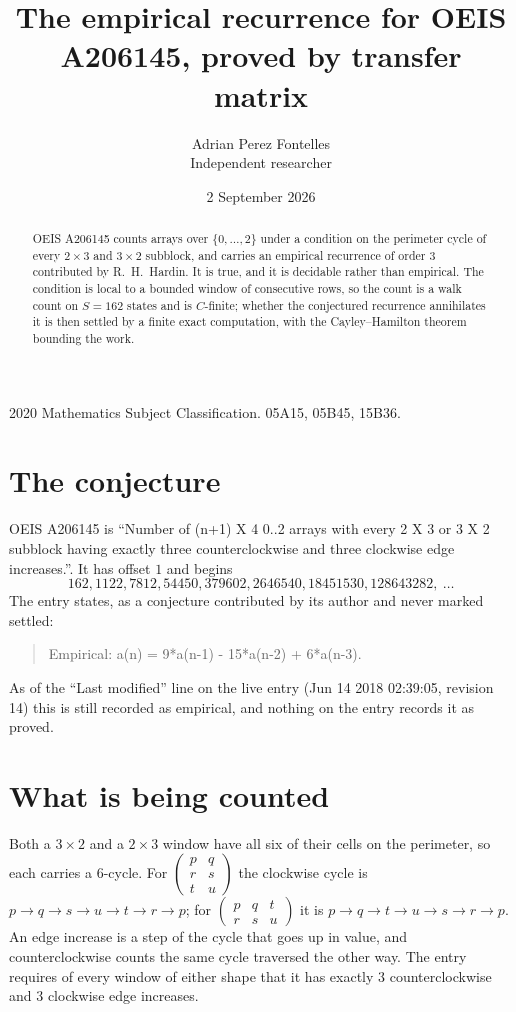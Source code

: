 \documentclass[11pt,a4paper]{article}
\title{The empirical recurrence for OEIS A206145, proved by transfer matrix}
\author{Adrian Perez Fontelles\\ \small Independent researcher}
\date{2 September 2026}
\theoremstyle{plain}
\theoremstyle{definition}
\begin{document}
\maketitle

\begin{abstract}
OEIS A206145 counts arrays over $\{0,\dots,2\}$ under a condition on the perimeter cycle of
every $2\times3$ and $3\times2$ subblock, and carries an empirical recurrence of order $3$ contributed by
R.~H.~Hardin. It is true, and it is decidable rather than empirical. The condition is local to
a bounded window of consecutive rows, so the count is a walk count on $S=162$ states and is
$C$-finite; whether the conjectured recurrence annihilates it is then settled by a finite exact
computation, with the Cayley--Hamilton theorem bounding the work.
\end{abstract}

\noindent\small 2020 Mathematics Subject Classification. 05A15, 05B45, 15B36.\normalsize

\section{The conjecture}

OEIS A206145 is ``Number of (n+1) X 4 0..2 arrays with every 2 X 3 or 3 X 2 subblock having exactly three counterclockwise and three clockwise edge increases.''. It has offset $1$ and begins
\[
162, 1122, 7812, 54450, 379602, 2646540, 18451530, 128643282,\ \dots
\]
The entry states, as a conjecture contributed by its author and never marked settled:
\begin{quote}
Empirical: a(n) = 9*a(n-1) - 15*a(n-2) + 6*a(n-3).
\end{quote}
As of the ``Last modified'' line on the live entry (Jun 14 2018 02:39:05, revision 14) this is still
recorded as empirical, and nothing on the entry records it as proved.

\section{What is being counted}

Both a $3\times2$ and a $2\times3$ window have all six of their cells on the
perimeter, so each carries a $6$-cycle. For
$\begin{pmatrix}p&q\\r&s\\t&u\end{pmatrix}$ the clockwise cycle is
$p\to q\to s\to u\to t\to r\to p$; for
$\begin{pmatrix}p&q&t\\r&s&u\end{pmatrix}$ it is
$p\to q\to t\to u\to s\to r\to p$. An edge increase is a step of the cycle that goes up in
value, and counterclockwise counts the same cycle traversed the other way. The entry requires
of every window of either shape that it has exactly $3$ counterclockwise and $3$ clockwise edge increases.
\end{document}
